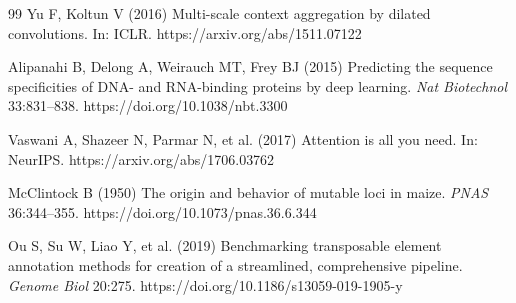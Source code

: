 \documentclass[12pt]{article}
\begin{document}
\begin{thebibliography}{99}
Yu F, Koltun V (2016) Multi-scale context aggregation by dilated convolutions. In: ICLR. https://arxiv.org/abs/1511.07122

Alipanahi B, Delong A, Weirauch MT, Frey BJ (2015) Predicting the sequence specificities of DNA- and RNA-binding proteins by deep learning. \textit{Nat Biotechnol} 33:831--838. https://doi.org/10.1038/nbt.3300

Vaswani A, Shazeer N, Parmar N, et al. (2017) Attention is all you need. In: NeurIPS. https://arxiv.org/abs/1706.03762

McClintock B (1950) The origin and behavior of mutable loci in maize. \textit{PNAS} 36:344--355. https://doi.org/10.1073/pnas.36.6.344

Ou S, Su W, Liao Y, et al. (2019) Benchmarking transposable element annotation methods for creation of a streamlined, comprehensive pipeline. \textit{Genome Biol} 20:275. https://doi.org/10.1186/s13059-019-1905-y

\end{thebibliography}
\end{document}
